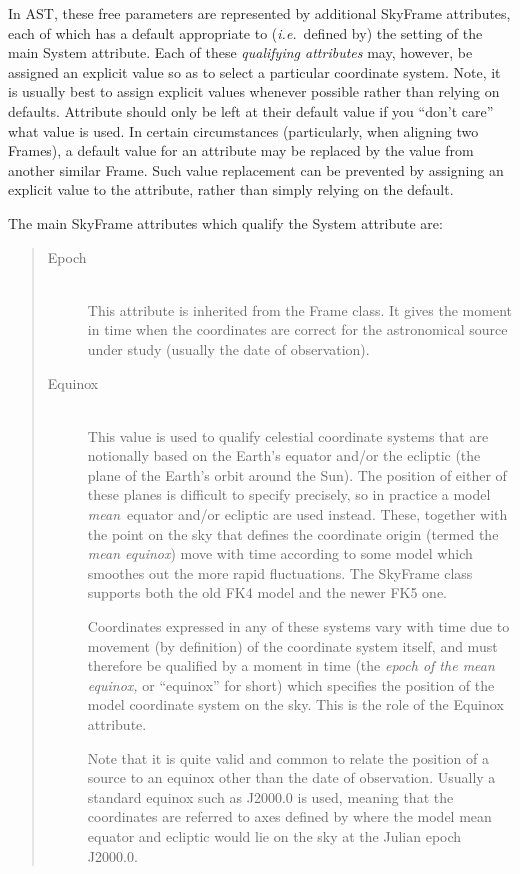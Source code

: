 \documentclass[twoside,11pt]{article}
\begin{document}
In AST, these free parameters are represented by additional SkyFrame
attributes, each of which has a default appropriate to
({\em{i.e.}}\ defined by) the setting of the main System
attribute. Each of these {\em{qualifying attributes}} may, however, be
assigned an explicit value so as to select a particular coordinate
system. Note, it is usually best to assign explicit
values whenever possible rather than relying on defaults. Attribute
should only be left at their default value if you ``don't care'' what
value is used. In certain circumstances (particularly, when aligning two
Frames), a default value for an attribute may be replaced by the value
from another similar Frame. Such value replacement can be prevented by 
assigning an explicit value to the attribute, rather than simply relying on 
the default.


The main SkyFrame attributes which qualify the System attribute are:

\begin{quote}
\begin{description}

\item[\label{ss:epochitem}Epoch]\mbox{}\\
This attribute is inherited from the Frame class. It gives the moment in
time when the coordinates are correct for the astronomical source
under study (usually the date of observation). 

\item[\label{ss:equinoxitem}Equinox]\mbox{}\\
This value is used to qualify celestial coordinate systems that are
notionally based on the Earth's equator and/or the ecliptic (the plane
of the Earth's orbit around the Sun). The position of either of these
planes is difficult to specify precisely, so in practice a model
{\em{mean}}\ equator and/or ecliptic are used instead. These, together
with the point on the sky that defines the coordinate origin (termed
the {\em{mean equinox}}) move with time according to some model which
smoothes out the more rapid fluctuations. The SkyFrame class supports
both the old FK4 model and the newer FK5 one.

Coordinates expressed in any of these systems vary with time due to
movement (by definition) of the coordinate system itself, and must
therefore be qualified by a moment in time (the {\em{epoch of the mean
equinox,}} or ``equinox'' for short) which specifies the position of
the model coordinate system on the sky. This is the role of the
Equinox attribute.

Note that it is quite valid and common to relate the position of a
source to an equinox other than the date of observation. Usually a
standard equinox such as J2000.0 is used, meaning that the coordinates
are referred to axes defined by where the model mean equator and
ecliptic would lie on the sky at the Julian epoch J2000.0.
\end{description}
\end{quote}
\end{document}
